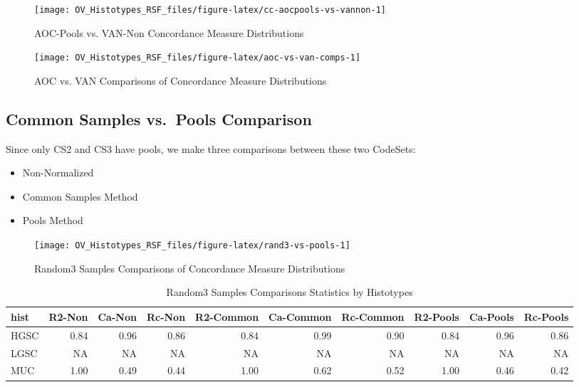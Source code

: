 \documentclass[
]{report}
\providecommand{\tightlist}{%
  \setlength{\itemsep}{0pt}\setlength{\parskip}{0pt}}
\begin{document}
\begin{figure}[H]

{\centering \texttt{[image: OV\_Histotypes\_RSF\_files/figure-latex/cc-aocpools-vs-vannon-1]} 

}

\caption{AOC-Pools vs. VAN-Non Concordance Measure Distributions}\label{fig:cc-aocpools-vs-vannon}
\end{figure}

\begin{figure}[H]

{\centering \texttt{[image: OV\_Histotypes\_RSF\_files/figure-latex/aoc-vs-van-comps-1]} 

}

\caption{AOC vs. VAN Comparisons of Concordance Measure Distributions}\label{fig:aoc-vs-van-comps}
\end{figure}

\hypertarget{common-samples-vs.-pools-comparison}{%
\subsection{Common Samples vs.~Pools Comparison}\label{common-samples-vs.-pools-comparison}}

Since only CS2 and CS3 have pools, we make three comparisons between these two CodeSets:

\begin{itemize}
\tightlist
\item
  Non-Normalized
\item
  Common Samples Method
\item
  Pools Method
\end{itemize}

\begin{figure}[H]

{\centering \texttt{[image: OV\_Histotypes\_RSF\_files/figure-latex/rand3-vs-pools-1]} 

}

\caption{Random3 Samples Comparisons of Concordance Measure Distributions}\label{fig:rand3-vs-pools}
\end{figure}

\begin{table}

\caption{\label{tab:rand3-vs-pools-stats}Random3 Samples Comparisons Statistics by Histotypes}
\centering
\begin{tabular}[t]{l|r|r|r|r|r|r|r|r|r}
\hline
hist & R2-Non & Ca-Non & Rc-Non & R2-Common & Ca-Common & Rc-Common & R2-Pools & Ca-Pools & Rc-Pools\\
\hline
HGSC & 0.84 & 0.96 & 0.86 & 0.84 & 0.99 & 0.90 & 0.84 & 0.96 & 0.86\\
\hline
LGSC & NA & NA & NA & NA & NA & NA & NA & NA & NA\\
\hline
MUC & 1.00 & 0.49 & 0.44 & 1.00 & 0.62 & 0.52 & 1.00 & 0.46 & 0.42\\
\hline
\end{tabular}
\end{table}
\end{document}
